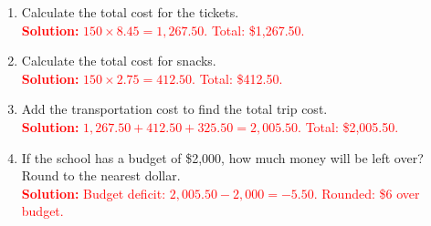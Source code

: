 \documentclass[12pt]{article}
\begin{document}
\vspace{1em}

\begin{tcolorbox}[colframe=black!60, colback=white, 
coltitle=black, colbacktitle=black!15, fonttitle=\bfseries\Large, 
title=Performance Task: Planning a Field Trip - Answer Key, halign title=center, left=10pt, right=10pt, top=10pt, bottom=100pt]
\begin{enumerate}[itemsep=3em]
    \item Calculate the total cost for the tickets.\\
    \textcolor{red}{\textbf{Solution:} 
    \( 150 \times 8.45 = 1,267.50 \). Total: \$1,267.50.}

    \item Calculate the total cost for snacks.\\
    \textcolor{red}{\textbf{Solution:} 
    \( 150 \times 2.75 = 412.50 \). Total: \$412.50.}

    \item Add the transportation cost to find the total trip cost.\\
    \textcolor{red}{\textbf{Solution:} 
    \( 1,267.50 + 412.50 + 325.50 = 2,005.50 \). Total: \$2,005.50.}

    \item If the school has a budget of \$2,000, how much money will be left over? Round to the nearest dollar.\\
    \textcolor{red}{\textbf{Solution:} 
    Budget deficit: \( 2,005.50 - 2,000 = -5.50 \). Rounded: \$6 over budget.}
\end{enumerate}
\end{tcolorbox}
\end{document}
